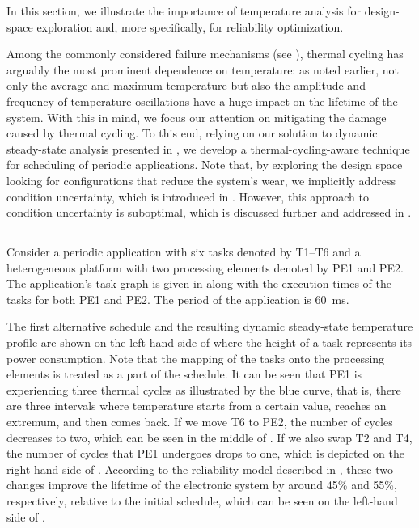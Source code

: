 In this section, we illustrate the importance of temperature analysis for
design-space exploration and, more specifically, for reliability optimization.

Among the commonly considered failure mechanisms (see
), thermal cycling has arguably the most prominent
dependence on temperature: as noted earlier, not only the average and maximum
temperature but also the amplitude and frequency of temperature oscillations
have a huge impact on the lifetime of the system. With this in mind, we focus
our attention on mitigating the damage caused by thermal cycling. To this end,
relying on our solution to dynamic steady-state analysis presented in
, we develop a thermal-cycling-aware technique for
scheduling of periodic applications. Note that, by exploring the design space
looking for configurations that reduce the system's wear, we implicitly address
condition uncertainty, which is introduced in .
However, this approach to condition uncertainty is suboptimal, which is
discussed further and addressed in .

\subsection{\motivationtitle}

Consider a periodic application with six tasks denoted by T1--T6 and a
heterogeneous platform with two processing elements denoted by PE1 and PE2. The
application's task graph is given in  along with
the execution times of the tasks for both PE1 and PE2. The period of the
application is 60~ms.

The first alternative schedule and the resulting dynamic steady-state
temperature profile are shown on the left-hand side of
 where the height of a task represents its power
consumption. Note that the mapping of the tasks onto the processing elements is
treated as a part of the schedule. It can be seen that PE1 is experiencing three
thermal cycles as illustrated by the blue curve, that is, there are three
intervals where temperature starts from a certain value, reaches an extremum,
and then comes back. If we move T6 to PE2, the number of cycles decreases to
two, which can be seen in the middle of . If we
also swap T2 and T4, the number of cycles that PE1 undergoes drops to one, which
is depicted on the right-hand side of . According
to the reliability model described in , these two
changes improve the lifetime of the electronic system by around 45\% and 55\%,
respectively, relative to the initial schedule, which can be seen on the
left-hand side of .

